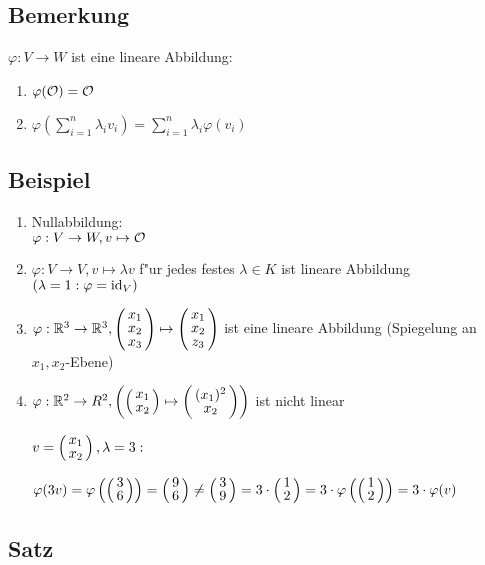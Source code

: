 \subsection{Bemerkung}
$\varphi: V \rightarrow W$ ist eine lineare Abbildung:
\begin{enumerate}
	\item
	$\varphi( \mathcal{O}) = \mathcal{O}$
	\item
	$\varphi \left(\sum_{i=1}^{n} \lambda_i v_i \right) = \sum_{i=1}^{n} \lambda_i \varphi(v_i)$ 
\end{enumerate}
\subsection{Beispiel}
\begin{enumerate}
	\item
	Nullabbildung:\\
	$\varphi: V \rightarrow W, v \mapsto \mathcal{O}$
	\item
	$\varphi : V \rightarrow V, v \mapsto \lambda v$ f"ur jedes festes $\lambda \in K$ ist lineare Abbildung $(\lambda = 1: \varphi = \mathrm{ id }_V )$
	\item
	$\varphi : \R^3 \rightarrow \R^3, \vct{x_1\\ x_2\\ x_3}\mapsto \vct{x_1 \\ x_2 \\ z_3}$ ist eine lineare Abbildung (Spiegelung an $x_1, x_2$-Ebene) 
	\item
	$\varphi : \R^ 2 \rightarrow R^2, \left(	\vct{x_1 \\ x_2} \mapsto \vct{(x_1)^2 \\ x_2 }\right)$ ist nicht linear
	
	$v= \vct{x_1 \\ x_2}, \lambda =3:$
	
	 $\varphi(3v)= \varphi\left(\vct{3 \\ 6}\right)=  \vct{9 \\ 6} \neq \vct{3 \\ 9} = 3 \cdot \vct{1\\2}= 3 \cdot \varphi \left(\vct{1\\2} \right) = 3 \cdot \varphi(v)$
	 \\

\end{enumerate}

\subsection{Satz}

